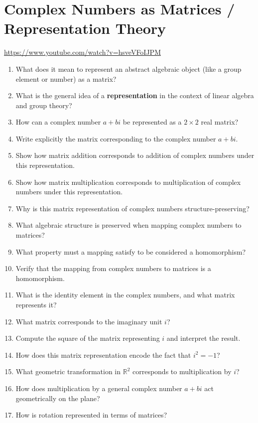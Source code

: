 \section{Complex Numbers as Matrices / Representation Theory}

\url{https://www.youtube.com/watch?v=hsveVFoIJPM}

\begin{enumerate}
  \item What does it mean to represent an abstract algebraic object (like a group element or number) as a matrix?
  \item What is the general idea of a \textbf{representation} in the context of linear algebra and group theory?
  \item How can a complex number $a + bi$ be represented as a $2 \times 2$ real matrix?
  \item Write explicitly the matrix corresponding to the complex number $a + bi$.
  \item Show how matrix addition corresponds to addition of complex numbers under this representation.
  \item Show how matrix multiplication corresponds to multiplication of complex numbers under this representation.
  \item Why is this matrix representation of complex numbers structure-preserving?
  \item What algebraic structure is preserved when mapping complex numbers to matrices?
  \item What property must a mapping satisfy to be considered a homomorphism?
  \item Verify that the mapping from complex numbers to matrices is a homomorphism.
  \item What is the identity element in the complex numbers, and what matrix represents it?
  \item What matrix corresponds to the imaginary unit $i$?
  \item Compute the square of the matrix representing $i$ and interpret the result.
  \item How does this matrix representation encode the fact that $i^2 = -1$?
  \item What geometric transformation in $\mathbb{R}^2$ corresponds to multiplication by $i$?
  \item How does multiplication by a general complex number $a + bi$ act geometrically on the plane?
  \item How is rotation represented in terms of matrices?

\end{enumerate}
